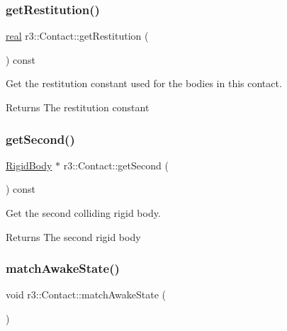 \subsubsection{\texorpdfstring{get\+Restitution()}{getRestitution()}}
{\footnotesize\ttfamily \mbox{\hyperlink{namespacer3_ab2016b3e3f743fb735afce242f0dc1eb}{real}} r3\+::\+Contact\+::get\+Restitution (\begin{DoxyParamCaption}{ }\end{DoxyParamCaption}) const}



Get the restitution constant used for the bodies in this contact. 

\begin{DoxyReturn}{Returns}
The restitution constant 
\end{DoxyReturn}
\mbox{\label{classr3_1_1_contact_a90af8f5c7cba65a6a84c57b5a6ef6d70}} 
\subsubsection{\texorpdfstring{get\+Second()}{getSecond()}}
{\footnotesize\ttfamily \mbox{\hyperlink{classr3_1_1_rigid_body}{Rigid\+Body}} $\ast$ r3\+::\+Contact\+::get\+Second (\begin{DoxyParamCaption}{ }\end{DoxyParamCaption}) const}



Get the second colliding rigid body. 

\begin{DoxyReturn}{Returns}
The second rigid body 
\end{DoxyReturn}
\mbox{\label{classr3_1_1_contact_a02d78ecc5afe6e7402dd11c655234e4a}} 
\subsubsection{\texorpdfstring{match\+Awake\+State()}{matchAwakeState()}}
{\footnotesize\ttfamily void r3\+::\+Contact\+::match\+Awake\+State (\begin{DoxyParamCaption}{ }\end{DoxyParamCaption})}


